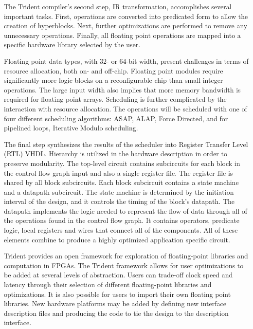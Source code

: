 \documentclass[12pt]{article}
\begin{document}
The Trident compiler's second step, IR transformation, accomplishes
several important tasks.  First, operations are converted into
predicated form to allow the creation of hyperblocks.  Next, further
optimizations are performed to remove any unnecessary operations.
Finally, all floating point operations are mapped into a specific
hardware library selected by the user.

Floating point data types, with 32- or 64-bit width, present
challenges in terms of resource allocation, both on- and off-chip.
Floating point modules require significantly more logic blocks on a
reconfigurable chip than small integer operations.  The large input
width also implies that more memory bandwidth is required for floating
point arrays. Scheduling is further complicated by the interaction
with resource allocation.  The operations will be scheduled with one
of four different scheduling algorithms: ASAP, ALAP, Force Directed,
and for pipelined loops, Iterative Modulo scheduling.

The final step synthesizes the results of the scheduler into Register
Transfer Level (RTL) VHDL.  Hierarchy is utilized in the hardware
description in order to preserve modularity.  The top-level circuit
contains subcircuits for each block in the control flow graph input
and also a single register file.  The register file is shared by all
block subcircuits.  Each block subcircuit contains a state machine and
a datapath subcircuit.  The state machine is determined by the
initiation interval of the design, and it controls the timing of the
block's datapath.  The datapath implements the logic needed to
represent the flow of data through all of the operations found in the
control flow graph.  It contains operators, predicate logic, local
registers and wires that connect all of the components.  All of these
elements combine to produce a highly optimized application specific
circuit.

Trident provides an open framework for exploration of floating-point
libraries and computation in FPGAs.  The Trident framework allows for
user optimizations to be added at several levels of abstraction.
Users can trade-off clock speed and latency through their selection of
different floating-point libraries and optimizations.  It is also
possible for users to import their own floating point libraries.  New
hardware platforms may be added by defining new interface description
files and producing the code to tie the design to the description
interface.


%


%
%



\end{document}
